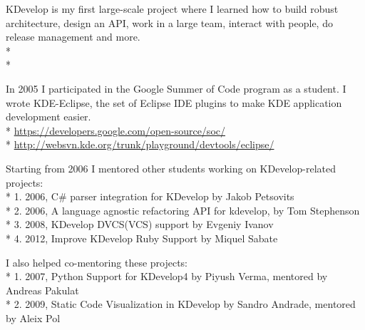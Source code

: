 \documentclass[12pt]{letter}
\begin{document}
\begin{llist}
            \item KDevelop is my first large-scale project where I learned how to build robust architecture, design an API, work in a large team, interact with people, do release management and more.\\*
            \\*

  \endexperience

  \location{}

  \startexperience

           \item In 2005 I participated in the Google Summer of Code program as a student. I wrote KDE-Eclipse, the set of Eclipse IDE plugins to make KDE application development easier.\\*
                \url{https://developers.google.com/open-source/soc/}\\*
                \url{http://websvn.kde.org/trunk/playground/devtools/eclipse/}

           \item Starting from 2006 I mentored other students working on KDevelop-related projects:\\*
                  1. 2006, C\# parser \/ integration for KDevelop by Jakob Petsovits\\*
                  2. 2006, A language agnostic refactoring API for kdevelop, by Tom Stephenson\\*
                  3. 2008, KDevelop DVCS(VCS) support by Evgeniy Ivanov\\*
                  4. 2012, Improve KDevelop Ruby Support by Miquel Sabate

            \item I also helped co-mentoring these projects:\\*
                  1. 2007, Python Support for KDevelop4 by Piyush Verma, mentored by Andreas Pakulat\\*
                  2. 2009, Static Code Visualization in KDevelop by Sandro Andrade, mentored by Aleix Pol

  \endexperience







\end{llist}
\end{document}
